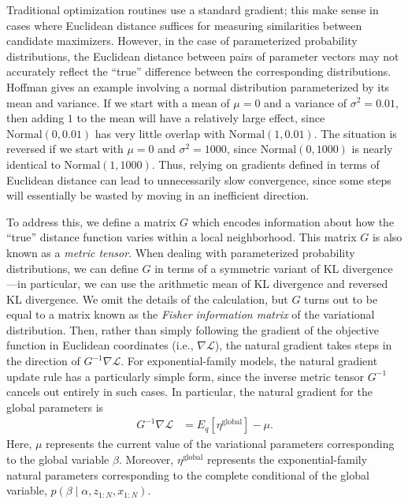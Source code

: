 \documentclass{article}
\begin{document}
Traditional optimization routines use a standard gradient; this make sense in cases where Euclidean distance suffices for measuring similarities between candidate maximizers.
However, in the case of parameterized probability distributions, the Euclidean distance between pairs of parameter vectors may not accurately reflect the ``true'' difference between the corresponding distributions.
Hoffman \cite{hoffman2013stochastic} gives an example involving a normal distribution parameterized by its mean and variance.
If we start with a mean of $\mu = 0$ and a variance of $\sigma^2 = 0.01$, then adding $1$ to the mean will have a relatively large effect, since $\text{Normal}(0, 0.01)$ has very little overlap with $\text{Normal}(1, 0.01)$.
The situation is reversed if we start with $\mu = 0$ and $\sigma^2 = 1000$, since $\text{Normal}(0, 1000)$ is nearly identical to $\text{Normal}(1, 1000)$.
Thus, relying on gradients defined in terms of Euclidean distance can lead to unnecessarily slow convergence, since some steps will essentially be wasted by moving in an inefficient direction.

To address this, we define a matrix $G$ which encodes information about how the ``true'' distance function varies within a local neighborhood.
This matrix $G$ is also known as a \emph{metric tensor}.
When dealing with parameterized probability distributions, we can define $G$ in terms of a symmetric variant of KL divergence---in particular, we can use the arithmetic mean of KL divergence and reversed KL divergence.
We omit the details of the calculation, but $G$ turns out to be equal to a matrix known as the \emph{Fisher information matrix} of the variational distribution.
Then, rather than simply following the gradient of the objective function in Euclidean coordinates (i.e., $\nabla \mathcal L$), the natural gradient takes steps in the direction of $G^{-1} \nabla \mathcal L$.
For exponential-family models, the natural gradient update rule has a particularly simple form, since the inverse metric tensor $G^{-1}$ cancels out entirely in such cases.
In particular, the natural gradient for the global parameters is
\begin{align}
G^{-1} \nabla \mathcal L
&=
E_q[\eta^{\text{global}}] - \mu.
\end{align}
Here, $\mu$ represents the current value of the variational parameters corresponding to the global variable $\beta$.
Moreover, $\eta^{\text{global}}$ represents the exponential-family natural parameters corresponding to the complete conditional of the global variable, $p(\beta \mid \alpha, z_{1:N}, x_{1:N})$.
\end{document}

